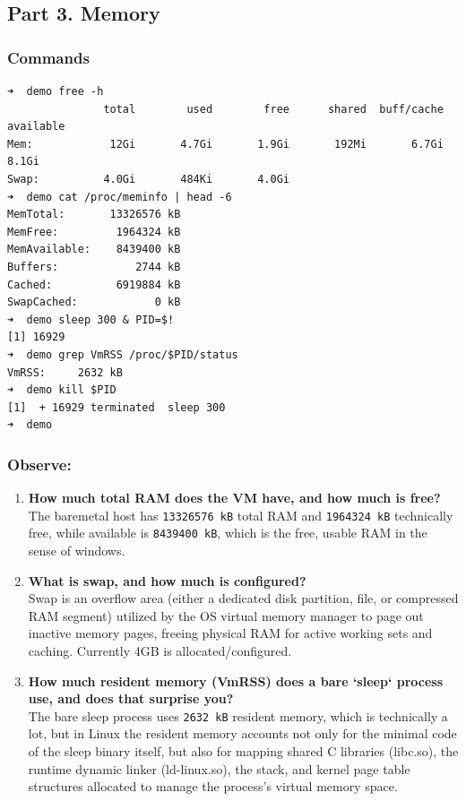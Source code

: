 \documentclass{labreport}
\begin{document}
\subsection{Part 3. Memory}

\subsubsection{Commands}
\begin{lstlisting}[style=bash]
➜  demo free -h
               total        used        free      shared  buff/cache   available
Mem:            12Gi       4.7Gi       1.9Gi       192Mi       6.7Gi       8.1Gi
Swap:          4.0Gi       484Ki       4.0Gi
➜  demo cat /proc/meminfo | head -6
MemTotal:       13326576 kB
MemFree:         1964324 kB
MemAvailable:    8439400 kB
Buffers:            2744 kB
Cached:          6919884 kB
SwapCached:            0 kB
➜  demo sleep 300 & PID=$!
[1] 16929
➜  demo grep VmRSS /proc/$PID/status
VmRSS:	   2632 kB
➜  demo kill $PID
[1]  + 16929 terminated  sleep 300
➜  demo
\end{lstlisting}

\subsubsection*{Observe:}
\begin{enumerate}[leftmargin=*]
    \item \textbf{How much total RAM does the VM have, and how much is free?}\\[0.2em]
    The baremetal host has \texttt{13326576 kB} total RAM and \texttt{1964324 kB} technically free, while available is \texttt{8439400 kB}, which is the free, usable RAM in the sense of windows.

    \item \textbf{What is swap, and how much is configured?}\\[0.2em]
    Swap is an overflow area (either a dedicated disk partition, file, or compressed RAM segment) utilized by the OS virtual memory manager to page out inactive memory pages, freeing physical RAM for active working sets and caching. Currently 4GB is allocated/configured.

    \item \textbf{How much resident memory (VmRSS) does a bare `sleep` process use, and does that surprise you?}\\[0.2em]
    The bare sleep process uses \texttt{2632 kB} resident memory, which is technically a lot, but in Linux the resident memory accounts not only for the minimal code of the sleep binary itself, but also for mapping shared C libraries (libc.so), the runtime dynamic linker (ld-linux.so), the stack, and kernel page table structures allocated to manage the process's virtual memory space.
\end{enumerate}
\end{document}
